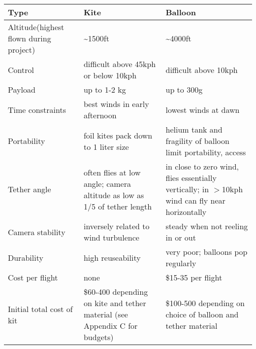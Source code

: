 \documentclass[letterpaper,portrait,12pt]{article}
\begin{document}
%
% 
\begin{table}[h]\begin{tabular}{|l|l|l|}
\hline
Type&Kite&Balloon\\
\hline
Altitude{\footnotesize (highest flown during project)}&\~{}1500ft&\~{}4000ft\\
\hline
Control&difficult above 45kph or below 10kph&difficult above 10kph\\
\hline
Payload&up to 1-2 kg&up to 300g\\
\hline
Time constraints&best winds in early afternoon&lowest winds at dawn\\
\hline
Portability&foil kites pack down to 1 liter size&helium tank and fragility of balloon limit portability, access\\
\hline
Tether angle&often flies at low angle; camera altitude as low as 1/5 of tether length&in close to zero wind, flies essentially vertically; in $>$10kph wind can fly near horizontally\\
\hline
Camera stability&inversely related to wind turbulence&steady when not reeling in or out\\
\hline
Durability&high reuseability&very poor; balloons pop regularly\\
\hline
Cost per flight&none&\$15-35 per flight\\
\hline
Initial total cost of kit&\$60-400 depending on kite and tether material (see Appendix C for budgets)&\$100-500 depending on choice of balloon and tether material\\
\hline
\end{tabular}
\end{table}



 
\end{document}
